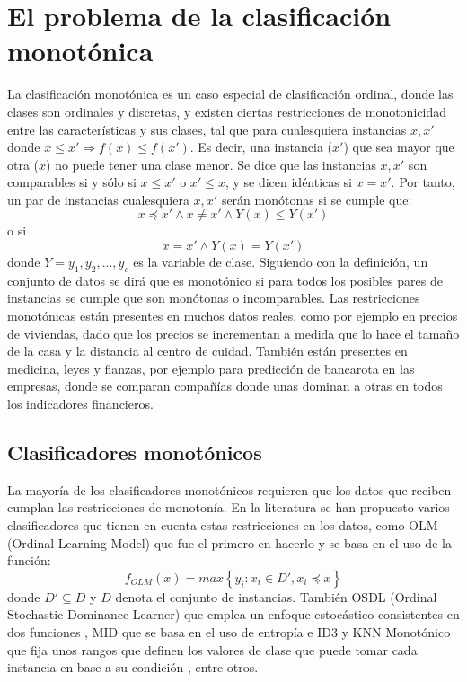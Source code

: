 \section{El problema de la clasificación monotónica}
La clasificación monotónica es un caso especial de clasificación ordinal, donde las clases son ordinales y discretas, y existen ciertas restricciones de monotonicidad entre las características y sus clases, tal que para cualesquiera instancias $x, x'$ donde $x \le x' \Rightarrow f(x) \le f(x')$. Es decir, una instancia ($x'$) que sea mayor que otra ($x$) no puede tener una clase menor. Se dice que las instancias $x, x'$ son comparables si y sólo si $x \leq x'$ o $x' \leq x$, y se dicen idénticas si $x=x'$. Por tanto, un par de instancias cualesquiera $x,x'$ serán monótonas si se cumple que: 
$$ x \preceq x' \land x \neq x' \land Y(x) \leq Y(x')$$ o si $$x=x' \land Y(x)=Y(x')$$ donde $Y={y_1,y_2,...,y_c}$ es la variable de clase. \newline
Siguiendo con la definición, un conjunto de datos se dirá que es monotónico si para todos los posibles pares de instancias se cumple que son monótonas o incomparables. \newline
Las restricciones monotónicas están presentes en muchos datos reales, como por ejemplo en precios de viviendas, dado que los precios se incrementan a medida que lo hace el tamaño de la casa y la distancia al centro de cuidad. También están presentes en medicina, leyes y fianzas, por ejemplo para predicción de bancarota en las empresas, donde se comparan compañías donde unas dominan a otras en todos los indicadores financieros.
\subsection{Clasificadores monotónicos}
La mayoría de los clasificadores monotónicos requieren que los datos que reciben cumplan las restricciones de monotonía. En la literatura se han propuesto varios clasificadores que tienen en cuenta estas restricciones en los datos, como OLM (Ordinal Learning Model) \cite{ben1989learning} que fue el primero en hacerlo y se basa en el uso de la función: $$ f_{OLM}(x) = max \left\{ y_i: x_i \in D', x_i \preceq x \right\}$$ donde $D' \subseteq D $ y $D$ denota el conjunto de instancias. También OSDL (Ordinal Stochastic Dominance Learner) que emplea un enfoque estocástico consistentes en dos funciones \cite{lievens2008probabilistic}, MID que se basa en el uso de entropía e ID3 \cite{ben1995monotonicity} y KNN Monotónico que fija unos rangos que definen los valores de clase que puede tomar cada instancia en base a su condición \cite{duivesteijn2008nearest}, entre otros.
